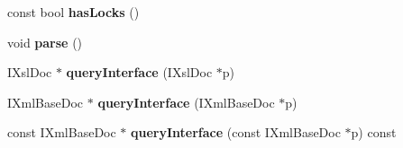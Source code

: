 \begin{DoxyCompactItemize}
\item 
\hypertarget{classgeneral__server_1_1LibXslDoc_a976084cd59d2db82d83aafb306b089fe}{const bool {\bfseries has\-Locks} ()}\label{classgeneral__server_1_1LibXslDoc_a976084cd59d2db82d83aafb306b089fe}

\item 
\hypertarget{classgeneral__server_1_1LibXslDoc_a6821b2107671f7df035c9203f875eb9b}{void {\bfseries parse} ()}\label{classgeneral__server_1_1LibXslDoc_a6821b2107671f7df035c9203f875eb9b}

\item 
\hypertarget{classgeneral__server_1_1LibXslDoc_a2461f54f6a48543f0502c6d0e81928a9}{\-I\-Xsl\-Doc $\ast$ {\bfseries query\-Interface} (\-I\-Xsl\-Doc $\ast$p)}\label{classgeneral__server_1_1LibXslDoc_a2461f54f6a48543f0502c6d0e81928a9}

\item 
\hypertarget{classgeneral__server_1_1LibXslDoc_a9e310ff5b4cd53a0718808405b6dc5f0}{\-I\-Xml\-Base\-Doc $\ast$ {\bfseries query\-Interface} (\-I\-Xml\-Base\-Doc $\ast$p)}\label{classgeneral__server_1_1LibXslDoc_a9e310ff5b4cd53a0718808405b6dc5f0}

\item 
\hypertarget{classgeneral__server_1_1LibXslDoc_a5fdd10457d9cf545bdaa5d6669560f7e}{const \-I\-Xml\-Base\-Doc $\ast$ {\bfseries query\-Interface} (const \-I\-Xml\-Base\-Doc $\ast$p) const }\label{classgeneral__server_1_1LibXslDoc_a5fdd10457d9cf545bdaa5d6669560f7e}

\end{DoxyCompactItemize}
